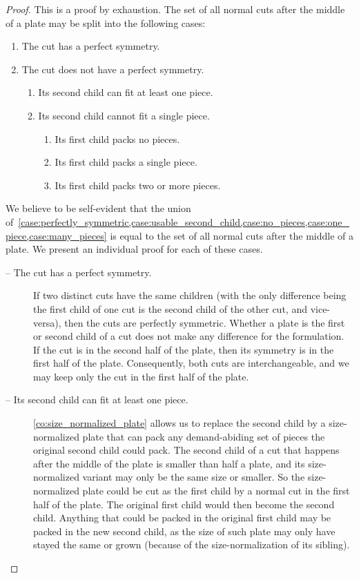 \documentclass[runningheads]{llncs}
\begin{document}
\begin{proof}
This is a proof by exhaustion. The set of all normal cuts after the middle of a plate may be split into the following cases:
\begin{enumerate}
  \item The cut has a perfect symmetry. \label{case:perfectly_symmetric}
  \item The cut does not have a perfect symmetry.
  \begin{enumerate}
    \item Its second child can fit at least one piece. \label{case:usable_second_child}
    \item Its second child cannot fit a single piece.
    \begin{enumerate}
      \item Its first child packs no pieces. \label{case:no_pieces}
      \item Its first child packs a single piece. \label{case:one_piece} %
      \item Its first child packs two or more pieces. \label{case:many_pieces}
    \end{enumerate}
  \end{enumerate}
\end{enumerate}

We believe to be self-evident that the union of~\cref{case:perfectly_symmetric,case:usable_second_child,case:no_pieces,case:one_piece,case:many_pieces} is equal to the set of all normal cuts after the middle of a plate. We present an individual proof for each of these cases.

\begin{description}
\item[ -- The cut has a perfect symmetry.]
If two distinct cuts have the same children (with the only difference being the first child of one cut is the second child of the other cut, and vice-versa), then the cuts are perfectly symmetric.
Whether a plate is the first or second child of a cut does not make any difference for the formulation.
If the cut is in the second half of the plate, then its symmetry is in the first half of the plate.
Consequently, both cuts are interchangeable, and we may keep only the cut in the first half of the plate.
\item[ -- Its second child can fit at least one piece.]
\autoref{co:size_normalized_plate} allows us to replace the second child by a size-normalized plate that can pack any demand-abiding set of pieces the original second child could pack.
The second child of a cut that happens after the middle of the plate is smaller than half a plate, and its size-normalized variant may only be the same size or smaller.
So the size-normalized plate could be cut as the first child by a normal cut in the first half of the plate.
The original first child would then become the second child.
Anything that could be packed in the original first child may be packed in the new second child, as the size of such plate may only have stayed the same or grown (because of the size-normalization of its sibling).


\end{description}
\end{proof}
\end{document}
